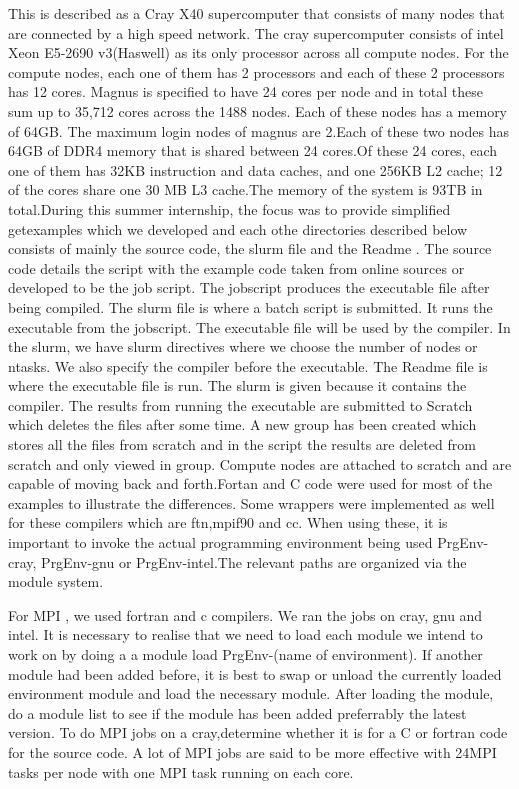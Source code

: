 \begin{Document}
{

This is described as a Cray X40 supercomputer that consists of many nodes that are connected by a high speed network. The cray supercomputer consists of intel Xeon E5-2690 v3(Haswell) as its only processor across all compute nodes. For the compute nodes, each one of them has 2 processors and each of these 2 processors has 12 cores.
Magnus is specified to have 24 cores per node and in total these sum up to 35,712 cores across the 1488 nodes. Each of these nodes has a memory of 64GB. The maximum login nodes of magnus are 2.Each of these two nodes has 64GB of DDR4 memory that is shared between 24 cores.Of these 24 cores, each one of them has 32KB instruction and data caches, and one 256KB L2 cache; 12 of the cores share one 30 MB L3 cache.The memory of the system is 93TB in total.During this summer internship, the focus was to provide simplified getexamples which we developed and each othe directories described below consists of mainly the source code, the slurm file and the Readme . The source code details the script with the example code taken from online sources or developed to be the job script. The jobscript produces the executable file after being compiled. The slurm file is where a batch script is submitted. It runs the executable from the jobscript. The executable file will be used by the compiler. In the slurm, we have slurm directives where we choose the number of nodes or ntasks. We also specify the compiler before the executable. The Readme file is where the executable file is run. The slurm is given because it contains the compiler. The results from running the executable are submitted to Scratch which deletes the files after some time. A new group has been created which stores all the files from scratch and in the script the results are deleted from scratch and only viewed in group. Compute nodes are attached to scratch and are capable of moving back and forth.$
$Fortan and C code were used for most of the examples to illustrate the differences. Some wrappers were implemented as well for these compilers which are ftn,mpif90 and cc. When using these, it is important to invoke the actual programming environment being used PrgEnv-cray, PrgEnv-gnu or PrgEnv-intel.The relevant paths are organized via the module system.




For MPI , we used fortran and c compilers. We ran the jobs on cray, gnu and intel.
It is necessary to realise that we need to load each module we intend to work on by doing a a module load PrgEnv-(name of environment). 
If another module had been added before, it is best to swap or unload the currently loaded environment module and load the necessary module.
After loading the module, do a module list to see if the module has been added preferrably the latest version.
To do MPI jobs on a cray,determine whether it is for a C or fortran code for the source code.
A lot of MPI jobs are said to be more effective with 24MPI tasks per node with one MPI task running on each core.

}
\end{Document}
